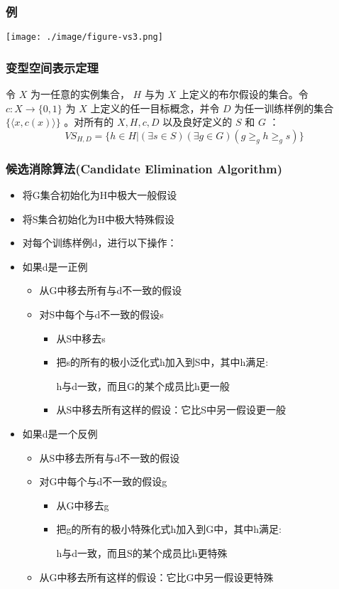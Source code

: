 \documentclass{beamer}
\begin{document}
\begin{frame}
\frametitle{例}
\label{sec-3-4}

\center
\texttt{[image: ./image/figure-vs3.png]}
\end{frame}
\begin{frame}
\frametitle{变型空间表示定理}
\label{sec-3-5}


令 $X$ 为一任意的实例集合， $H$ 与为 $X$ 上定义的布尔假设的集合。令 $c: X\rightarrow\{0, 1\}$ 为 $X$ 上定义的任一目标概念，并令 $D$ 为任一训练样例的集合 $\{\langle x, c(x)\rangle\}$ 。对所有的 $X,H,c,D$ 以及良好定义的 $S$ 和 $G$ ：
 $$VS_{H,D} = \{ h\in H | (\exists s\in S) (\exists g\in G) (g\geq_g h \geq_g s)\}$$
\end{frame}
\begin{frame}
\frametitle{候选消除算法(Candidate Elimination Algorithm)}
\label{sec-3-6}

\begin{itemize}
\item 将G集合初始化为H中极大一般假设
\item 将S集合初始化为H中极大特殊假设
\item 对每个训练样例d，进行以下操作：
\item 如果d是一正例
\begin{itemize}
\item 从G中移去所有与d不一致的假设
\item 对S中每个与d不一致的假设s
\begin{itemize}
\item 从S中移去s
\item 把s的所有的极小泛化式h加入到S中，其中h满足:

                 h与d一致，而且G的某个成员比h更一般
\item 从S中移去所有这样的假设：它比S中另一假设更一般
\end{itemize}
\end{itemize}
\item 如果d是一个反例
\begin{itemize}
\item 从S中移去所有与d不一致的假设
\item 对G中每个与d不一致的假设g
\begin{itemize}
\item 从G中移去g
\item 把g的所有的极小特殊化式h加入到G中，其中h满足:

                h与d一致，而且S的某个成员比h更特殊
\end{itemize}
\item 从G中移去所有这样的假设：它比G中另一假设更特殊
\end{itemize}
\end{itemize}
\end{frame}
\end{document}
